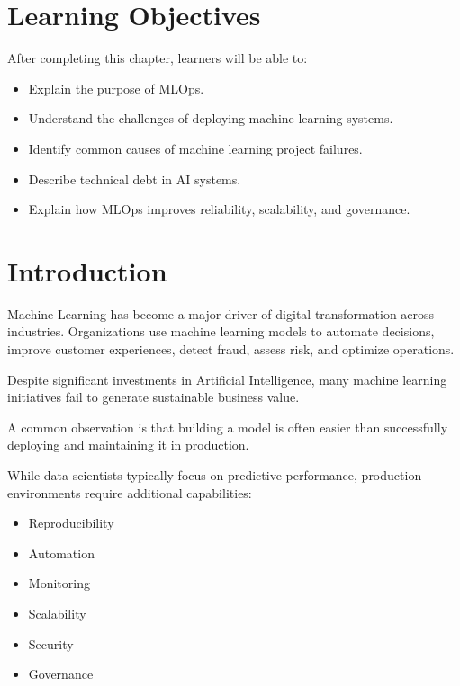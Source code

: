 
\label{chap:why-mlops}

\section{Learning Objectives}

After completing this chapter, learners will be able to:

\begin{itemize}
    \item Explain the purpose of MLOps.
    \item Understand the challenges of deploying machine learning systems.
    \item Identify common causes of machine learning project failures.
    \item Describe technical debt in AI systems.
    \item Explain how MLOps improves reliability, scalability, and governance.
\end{itemize}

\section{Introduction}

Machine Learning has become a major driver of digital transformation across industries. Organizations use machine learning models to automate decisions, improve customer experiences, detect fraud, assess risk, and optimize operations.

Despite significant investments in Artificial Intelligence, many machine learning initiatives fail to generate sustainable business value.

A common observation is that building a model is often easier than successfully deploying and maintaining it in production.

While data scientists typically focus on predictive performance, production environments require additional capabilities:

\begin{itemize}
    \item Reproducibility
    \item Automation
    \item Monitoring
    \item Scalability
    \item Security
    \item Governance
\end{itemize}

